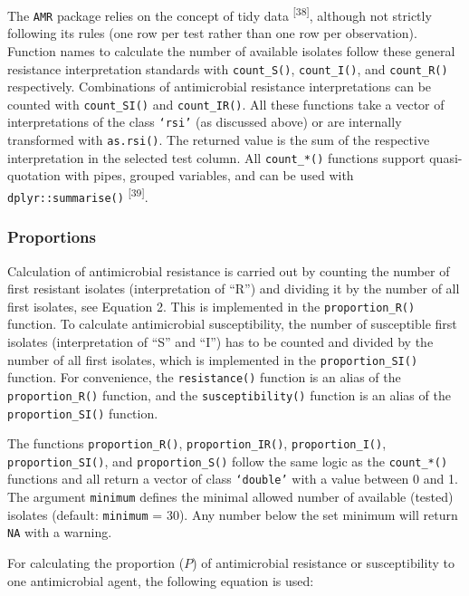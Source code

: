 \documentclass[
]{book}
\begin{document}
The \texttt{AMR} package relies on the concept of tidy data \textsuperscript{{[}38{]}}, although not strictly following its rules (one row per test rather than one row per observation). Function names to calculate the number of available isolates follow these general resistance interpretation standards with \texttt{count\_S()}, \texttt{count\_I()}, and \texttt{count\_R()} respectively. Combinations of antimicrobial resistance interpretations can be counted with \texttt{count\_SI()} and \texttt{count\_IR()}. All these functions take a vector of interpretations of the class \texttt{‘rsi’} (as discussed above) or are internally transformed with \texttt{as.rsi()}. The returned value is the sum of the respective interpretation in the selected test column. All \texttt{count\_*()} functions support quasi-quotation with pipes, grouped variables, and can be used with \texttt{dplyr::summarise()} \textsuperscript{{[}39{]}}.

\hypertarget{proportions}{%
\subsubsection{Proportions}\label{proportions}}

Calculation of antimicrobial resistance is carried out by counting the number of first resistant isolates (interpretation of ``R'') and dividing it by the number of all first isolates, see Equation 2. This is implemented in the \texttt{proportion\_R()} function. To calculate antimicrobial susceptibility, the number of susceptible first isolates (interpretation of ``S'' and ``I'') has to be counted and divided by the number of all first isolates, which is implemented in the \texttt{proportion\_SI()} function. For convenience, the \texttt{resistance()} function is an alias of the \texttt{proportion\_R()} function, and the \texttt{susceptibility()} function is an alias of the \texttt{proportion\_SI()} function.

The functions \texttt{proportion\_R()}, \texttt{proportion\_IR()}, \texttt{proportion\_I()}, \texttt{proportion\_SI()}, and \texttt{proportion\_S()} follow the same logic as the \texttt{count\_*()} functions and all return a vector of class \texttt{‘double’} with a value between 0 and 1. The argument \texttt{minimum} defines the minimal allowed number of available (tested) isolates (default: \texttt{minimum} = 30). Any number below the set minimum will return \texttt{NA} with a warning.

For calculating the proportion (\(P\)) of antimicrobial resistance or susceptibility to one antimicrobial agent, the following equation is used:
\end{document}
